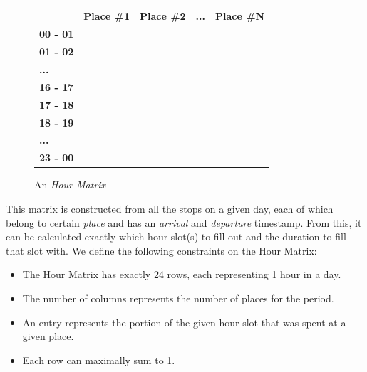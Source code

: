 \begin{figure}[h]
    \centering
    \begin{tabular}{|l|l|l|l|l|}
    \hline
    \textbf{}        & \textbf{Place \#1} & \textbf{Place \#2} & \textbf{...} & \textbf{Place \#N} \\ \hline
    \textbf{00 - 01} &                    &                    &              &                    \\ \hline
    \textbf{01 - 02} &                    &                    &              &                    \\ \hline
    \textbf{...}     &                    &                    &              &                    \\ \hline
    \textbf{16 - 17} &                    &                    &              &                    \\ \hline
    \textbf{17 - 18} &                    &                    &              &                    \\ \hline
    \textbf{18 - 19} &                    &                    &              &                    \\ \hline
    \textbf{...}     &                    &                    &              &                    \\ \hline
    \textbf{23 - 00} &                    &                    &              &                    \\ \hline
    \end{tabular}
    \caption{An \textit{Hour Matrix}}
    \label{fig:time-table}
\end{figure}

This matrix is constructed from all the stops on a given day, each of which belong to certain \textit{place} and has an \textit{arrival} and \textit{departure} timestamp. From this, it can be calculated exactly which hour slot(s) to fill out and the duration to fill that slot with. We define the following constraints on the Hour Matrix:

\begin{itemize}
    \item The Hour Matrix has exactly 24 rows, each representing 1 hour in a day.
    \item The number of columns represents the number of places for the period. 
    \item An entry represents the portion of the given hour-slot that was spent at a given place.
    \item Each row can maximally sum to 1.
\end{itemize}

